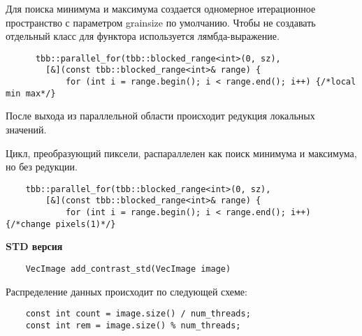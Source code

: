 \documentclass{report}
\begin{document}
    \par Для поиска минимума и максимума создается одномерное итерационное пространство с параметром grainsize по умолчанию. Чтобы не создавать отдельный класс для функтора используется лямбда-выражение.
    \begin{lstlisting}
      tbb::parallel_for(tbb::blocked_range<int>(0, sz),
        [&](const tbb::blocked_range<int>& range) {
            for (int i = range.begin(); i < range.end(); i++) {/*local min max*/}
    \end{lstlisting}
    После выхода из параллельной области происходит редукция локальных значений.
    \par Цикл, преобразующий пиксели, распараллелен как поиск минимума и максимума, но без редукции.
    \begin{lstlisting}
    tbb::parallel_for(tbb::blocked_range<int>(0, sz),
        [&](const tbb::blocked_range<int>& range) {
            for (int i = range.begin(); i < range.end(); i++) {/*change pixels(1)*/}
    \end{lstlisting}    

    \newpage
    \textbf{STD версия}
    \begin{lstlisting}
    VecImage add_contrast_std(VecImage image)
    \end{lstlisting}
    Распределение данных происходит по следующей схеме:
    \begin{lstlisting}
    const int count = image.size() / num_threads;
    const int rem = image.size() % num_threads;
    \end{lstlisting}
    
\end{document}
